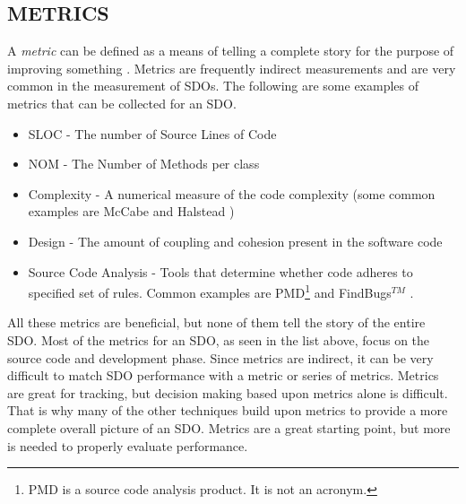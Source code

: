 \documentclass[SDSUThesis.tex]{subfiles}
\begin{document}
    \subsection{METRICS}
        A \textit{metric} can be defined as a means of telling a complete story
        for the purpose of improving something \cite{Klubeck2011}.  Metrics are
        frequently indirect measurements and
        are very common in the measurement of SDOs.  
        The following are some examples of metrics that can be collected 
        for an SDO. 
        \begin{itemize}
            \item SLOC - The number of Source Lines of Code 
            \item NOM - The Number of Methods per class
            \item Complexity - A numerical measure of the code complexity
                (some common examples are McCabe \cite{McCabe1976} and 
                Halstead \cite{Halstead1977})
            \item Design - The amount of coupling and cohesion present 
                in the software code
            \item Source Code Analysis - Tools that determine whether 
                code adheres to specified set of rules. Common 
                examples are PMD\footnote{PMD is a source code analysis product.  
                It is not an acronym.} and FindBugs$^{TM}$ \cite{PMD, Findbugs}.
        \end{itemize}
        All these metrics are beneficial, but none of them tell the story of the entire
        SDO.  Most of the metrics for an SDO, as seen in the list above, focus on 
        the source code and development phase. 
        Since metrics are indirect, it can be very difficult to match SDO performance with
        a metric or series of metrics.  Metrics are great for tracking, but decision making
        based upon metrics alone is difficult.  That is why many of the other techniques
        build upon metrics to provide a more complete overall picture of an SDO. Metrics are a great starting point, but more is needed to properly 
        evaluate performance. 
\end{document}
